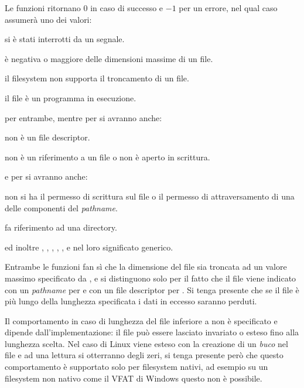 \begin{funcproto}{
}
{Le funzioni ritornano $0$ in caso di successo e $-1$ per un errore, nel qual
  caso  assumerà uno dei valori: 
  \begin{errlist}
  \item[\errcode{EINTR}] si è stati interrotti da un segnale.
  \item[\errcode{EINVAL}]  è negativa o maggiore delle
    dimensioni massime di un file.
  \item[\errcode{EPERM}] il filesystem non supporta il troncamento di un file.
  \item[\errcode{ETXTBSY}] il file è un programma in esecuzione.
  \end{errlist} 
  per entrambe, mentre per  si avranno anche: 
  \begin{errlist}
  \item[\errcode{EBADF}]  non è un file descriptor.
  \item[\errcode{EINVAL}]  non è un riferimento a un file o non è
    aperto in scrittura. 
  \end{errlist}
  e per  si avranno anche: 
  \begin{errlist}
  \item[\errcode{EACCES}] non si ha il permesso di scrittura sul file o il
    permesso di attraversamento di una delle componenti del \textit{pathname}.
  \item[\errcode{EISDIR}]  fa riferimento ad una directory.
  \end{errlist}
  ed inoltre , , ,
  , ,  e 
  nel loro significato generico.}
\end{funcproto}

Entrambe le funzioni fan sì che la dimensione del file sia troncata ad un
valore massimo specificato da , e si distinguono solo per il
fatto che il file viene indicato con un \textit{pathname} per 
e con un file descriptor per . Si tenga presente che se il
file è più lungo della lunghezza specificata i dati in eccesso saranno
perduti.

Il comportamento in caso di lunghezza del file inferiore a  non
è specificato e dipende dall'implementazione: il file può essere lasciato
invariato o esteso fino alla lunghezza scelta. Nel caso di Linux viene esteso
con la creazione di un \textsl{buco} nel file e ad una lettura si otterranno
degli zeri, si tenga presente però che questo comportamento è supportato solo
per filesystem nativi, ad esempio su un filesystem non nativo come il VFAT di
Windows questo non è possibile.


